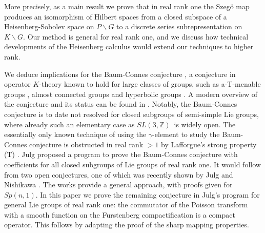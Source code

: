 \documentclass[a4paper,reqno]{amsart}
\numberwithin{equation}{section}
\def\Z{\mathbb{Z}}
\theoremstyle{definition}
\theoremstyle{remark}
\begin{document}
More precisely, as a main result we prove that in real rank one the Szegö map produces an isomorphism of Hilbert spaces from a closed subspace of a Heisenberg-Sobolev space on $P\backslash G$ to a discrete series subrepresentation on $K\backslash G$. Our method is general for real rank one, and we discuss how technical developments of the Heisenberg calculus would extend our techniques to higher rank. 

We deduce implications for the Baum-Connes conjecture \cite{bch}, a conjecture in operator $K$-theory known to hold for large classes of groups, such as a-T-menable groups \cite{higsonkasp}, almost connected groups \cite{chabert03} and hyperbolic groups \cite{laffa,laffahyp}. A modern overview of the conjecture and its status can be found in \cite{julg19}. Notably, the Baum-Connes conjecture is to date not resolved for closed subgroups of semi-simple Lie groups, where already such an elementary case as $SL(3,\Z)$ is widely open.  The essentially only known technique of using the $\gamma$-element to study the Baum-Connes conjecture is obstructed in real rank $>1$ by Lafforgue's strong property (T) \cite{laffastrong}. Julg proposed a program \cite{julghow}  to prove the Baum-Connes conjecture with coefficients for all closed subgroups of Lie groups of real rank one. It would follow from two open conjectures, one of which was recently shown by Julg and Nishikawa \cite{julgnishi}.  The works  \cite{julghow,julgnishi} provide a general approach, with proofs given for $Sp(n,1)$. In this paper we prove the remaining conjecture in Julg's program for general Lie groups of real rank one: the commutator of the Poisson transform with a smooth function on the Furstenberg compactification is a compact operator. This follows by adapting the proof of the sharp mapping properties. 
\end{document}
